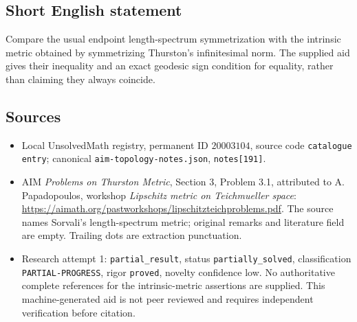\documentclass[11pt]{article}
\begin{document}
\subsection{Short English statement}
Compare the usual endpoint length-spectrum symmetrization with the intrinsic metric obtained by symmetrizing Thurston's infinitesimal norm. The supplied aid gives their inequality and an exact geodesic sign condition for equality, rather than claiming they always coincide.
\subsection{Sources}
\begin{itemize}
\item Local UnsolvedMath registry, permanent ID $20003104$, source code \texttt{catalogue entry}; canonical \texttt{aim-topology-notes.json}, \texttt{notes[191]}.
\item AIM \emph{Problems on Thurston Metric}, Section 3, Problem 3.1, attributed to A. Papadopoulos, workshop \emph{Lipschitz metric on Teichmueller space}: \url{https://aimath.org/pastworkshops/lipschitzteichproblems.pdf}. The source names Sorvali's length-spectrum metric; original remarks and literature field are empty. Trailing dots are extraction punctuation.
\item Research attempt 1: \texttt{partial\_result}, status \texttt{partially\_solved}, classification \texttt{PARTIAL-PROGRESS}, rigor \texttt{proved}, novelty confidence low. No authoritative complete references for the intrinsic-metric assertions are supplied. This machine-generated aid is not peer reviewed and requires independent verification before citation.
\end{itemize}
\end{document}
